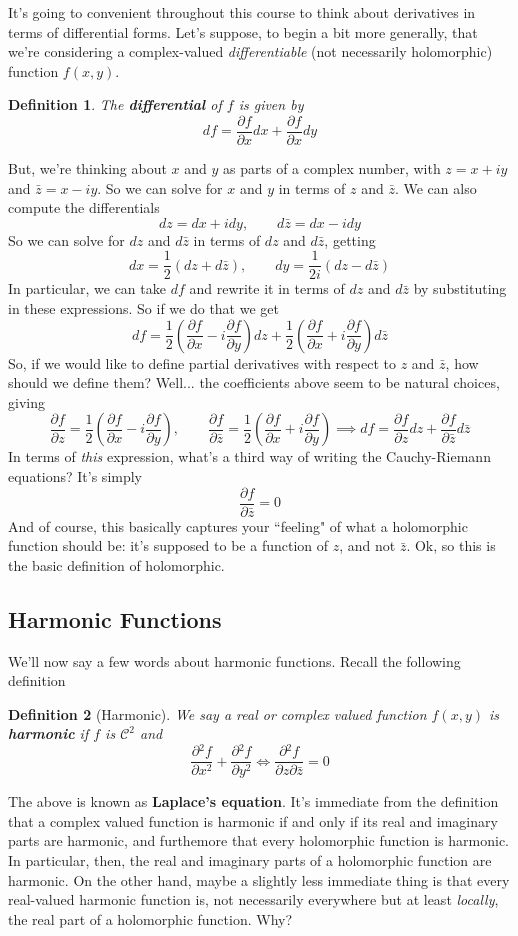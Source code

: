 \documentclass{article}
\newcommand{\mc}[1]{\mathcal{#1}}
\newcommand{\prt}[2]{{\frac{\partial {#1}}{\partial {#2}}}}
\newtheorem{definition}{Definition}
\begin{document}
It's going to convenient throughout this course to think about derivatives in terms of differential forms. Let's suppose, to begin a bit more generally, that we're considering a complex-valued \textit{differentiable} (not necessarily holomorphic) function \(f(x, y)\).
\begin{definition}
The \textbf{differential} of \(f\) is given by
\[df = \prt{f}{x}dx + \prt{f}{x}dy\]
\end{definition}
But, we're thinking about \(x\) and \(y\) as parts of a complex number, with \(z = x + iy\) and \(\bar{z} = x - iy\). So we can solve for \(x\) and \(y\) in terms of \(z\) and \(\bar{z}\). We can also compute the differentials
\[dz = dx + idy, \qquad d\bar{z} = dx - idy\]
So we can solve for \(dz\) and \(d\bar{z}\) in terms of \(dz\) and \(d\bar{z}\), getting
\[dx = \frac{1}{2}(dz + d\bar{z}), \qquad dy = \frac{1}{2i}(dz - d\bar{z})\]
In particular, we can take \(df\) and rewrite it in terms of \(dz\) and \(d\bar{z}\) by substituting in these expressions. So if we do that we get
\[df = \frac{1}{2}\left(\prt{f}{x} - i\prt{f}{y}\right)dz + \frac{1}{2}\left(\prt{f}{x} + i\prt{f}{y}\right)d\bar{z}\]
So, if we would like to define partial derivatives with respect to \(z\) and \(\bar{z}\), how should we define them? Well... the coefficients above seem to be natural choices, giving
\[\prt{f}{z} = \frac{1}{2}\left(\prt{f}{x} - i\prt{f}{y}\right),
  \qquad \prt{f}{\bar{z}}
= \frac{1}{2}\left(\prt{f}{x} + i\prt{f}{y}\right)
\implies df = \prt{f}{z}dz + \prt{f}{\bar{z}}d\bar{z}\]
In terms of \textit{this} expression, what's a third way of writing the Cauchy-Riemann equations? It's simply
\[\prt{f}{\bar{z}} = 0\]
And of course, this basically captures your ``feeling" of what a holomorphic function should be: it's supposed to be a function of \(z\), and not \(\bar{z}\). Ok, so this is the basic definition of holomorphic.

\subsection{Harmonic Functions}

We'll now say a few words about harmonic functions. Recall the following definition
\begin{definition}[Harmonic]
We say a real or complex valued function \(f(x, y)\) is \textbf{harmonic} if \(f\) is \(\mc{C}^2\) and
\[\prt{^2f}{x^2} + \prt{^2f}{y^2} \iff \prt{^2f}{z\partial\bar{z}} = 0\]
\end{definition}
The above is known as \textbf{Laplace's equation}. It's immediate from the definition that a complex valued function is harmonic if and only if its real and imaginary parts are harmonic, and furthemore that every holomorphic function is harmonic. In particular, then, the real and imaginary parts of a holomorphic function are harmonic. On the other hand, maybe a slightly less immediate thing is that every real-valued harmonic function is, not necessarily everywhere but at least \textit{locally}, the real part of a holomorphic function. Why?
\end{document}
